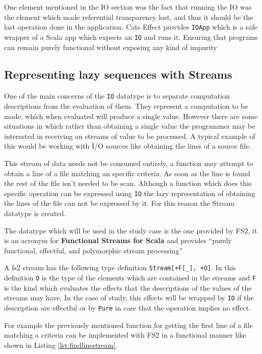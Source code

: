 \documentclass[../main.tex]{subfiles}
\begin{document}
One element mentioned in the IO section was the fact that running the IO was the
element which made referential transparency lost, and thus it should be the last
operation done in the application. Cats Effect provides \texttt{IOApp} which is
a safe wrapper of a Scala app which expects an \texttt{IO} and runs it. Ensuring
that programs can remain purely functional without exposing any kind of impurity

\subsection{Representing lazy sequences with Streams}
One of the main concerns of the \texttt{IO} datatype is to separate computation
descriptions from the evaluation of them. They represent a computation to be
made, which when evaluated will produce a single value. However there are some
situations in which rather than obtaining a single value the programmer may be
interested in receiving an streams of value to be processed. A typical example
of this would be working with I/O sources like obtaining the lines of a source
file.

This stream of data needs not be consumed entirely, a function may attempt to
obtain a line of a file matching an specific criteria. As soon as the line is
found the rest of the file isn't needed to be scan. Although a function which does
this specific operation can be expressed using \texttt{IO} the lazy
representation of obtaining the lines of the file can not be expressed by it. For this
reason the Stream datatype is created.

The datatype which will be used in the study case is the one provided by FS2, it
is an acronym for \textbf{Functional Streams for Scala} and provides ``purely
functional, effectful, and polymorphic stream processing'' \autocite{Fs2:Home}

A fs2 stream has the following type definition \texttt{Stream[+F[\_], +O]}. In
this definition \texttt{O} is the type of the elements which are contained in
the streams and \texttt{F} is the kind which evaluates the effects that the
descriptions of the values of the streams may have. In the case of study, this
effects will be wrapped by \texttt{IO} if the description are effectful or by
\texttt{Pure} in case that the operation implies no effect.

For example the previously mentioned function for getting the first line of a
file matching a criteria can be implemented with FS2 in a functional manner like
shown in Listing \ref{lst:findlinestream}.
\end{document}
